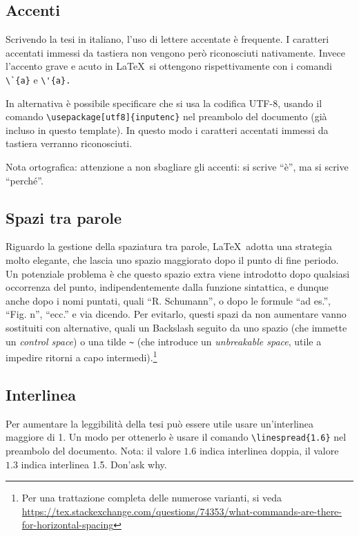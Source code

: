 \documentclass[12pt]{report}
\begin{document}
\subsection{Accenti}

Scrivendo la tesi in italiano, l'uso di lettere accentate \`e frequente. I caratteri accentati immessi da tastiera non vengono per\`o riconosciuti nativamente. Invece l'accento grave e acuto in \LaTeX\ si ottengono rispettivamente con i comandi \verb|\`{a}| e \verb|\'{a}.| 

In alternativa \`e possibile specificare che si usa la codifica UTF-8, usando il comando \verb|\usepackage[utf8]{inputenc}| nel preambolo del documento (già incluso in questo template). In questo modo i caratteri accentati immessi da tastiera verranno riconosciuti.

Nota ortografica: attenzione a non sbagliare gli accenti: si scrive ``\`e'', ma si scrive ``perch\'e''.

\subsection{Spazi tra parole}

Riguardo la gestione della spaziatura tra parole, \LaTeX\ adotta una strategia molto elegante, che lascia uno spazio maggiorato dopo il punto di fine periodo. Un potenziale problema è che questo spazio extra viene introdotto dopo qualsiasi occorrenza del punto, indipendentemente dalla funzione sintattica, e dunque anche dopo i nomi puntati, quali ``R. Schumann'', o dopo le formule ``ad es.'', ``Fig. n'', ``ecc.'' e via dicendo. Per evitarlo, questi spazi da non aumentare vanno sostituiti con alternative, quali un Backslash seguito da uno spazio (che immette un \textit{control space}) o una tilde \verb|~| (che introduce un \textit{unbreakable space}, utile a impedire ritorni a capo intermedi).\footnote{Per una trattazione completa delle numerose varianti, si veda \url{https://tex.stackexchange.com/questions/74353/what-commands-are-there-for-horizontal-spacing}}

\subsection{Interlinea}

Per aumentare la leggibilit\`a della tesi pu\`o essere utile usare un'interlinea maggiore di 1. Un modo per ottenerlo \`e usare il comando \verb|\linespread{1.6}| nel preambolo del documento. Nota: il valore $1.6$ indica interlinea doppia, il valore $1.3$ indica interlinea 1.5. Don'ask why.
\end{document}
